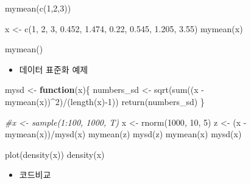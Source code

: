 \documentclass[
]{book}
\newenvironment{Shaded}{\begin{snugshade}}{\end{snugshade}}
\newcommand{\CommentTok}[1]{\textcolor[rgb]{0.56,0.35,0.01}{\textit{#1}}}
\newcommand{\ControlFlowTok}[1]{\textcolor[rgb]{0.13,0.29,0.53}{\textbf{#1}}}
\newcommand{\DecValTok}[1]{\textcolor[rgb]{0.00,0.00,0.81}{#1}}
\newcommand{\FloatTok}[1]{\textcolor[rgb]{0.00,0.00,0.81}{#1}}
\newcommand{\FunctionTok}[1]{\textcolor[rgb]{0.00,0.00,0.00}{#1}}
\newcommand{\NormalTok}[1]{#1}
\newcommand{\OtherTok}[1]{\textcolor[rgb]{0.56,0.35,0.01}{#1}}
\newcommand{\SpecialCharTok}[1]{\textcolor[rgb]{0.00,0.00,0.00}{#1}}
\providecommand{\tightlist}{%
  \setlength{\itemsep}{0pt}\setlength{\parskip}{0pt}}
\begin{document}
\begin{Shaded}
\begin{Highlighting}[]
\FunctionTok{mymean}\NormalTok{(}\FunctionTok{c}\NormalTok{(}\DecValTok{1}\NormalTok{,}\DecValTok{2}\NormalTok{,}\DecValTok{3}\NormalTok{))}

\NormalTok{x }\OtherTok{\textless{}{-}} \FunctionTok{c}\NormalTok{(}\DecValTok{1}\NormalTok{, }\DecValTok{2}\NormalTok{, }\DecValTok{3}\NormalTok{, }\FloatTok{0.452}\NormalTok{, }\FloatTok{1.474}\NormalTok{, }\FloatTok{0.22}\NormalTok{, }\FloatTok{0.545}\NormalTok{, }\FloatTok{1.205}\NormalTok{, }\FloatTok{3.55}\NormalTok{)}
\FunctionTok{mymean}\NormalTok{(x)}

\FunctionTok{mymean}\NormalTok{()}
\end{Highlighting}
\end{Shaded}

\begin{itemize}
\tightlist
\item
  데이터 표준화 예제
\end{itemize}

\begin{Shaded}
\begin{Highlighting}[]
\NormalTok{mysd }\OtherTok{\textless{}{-}} \ControlFlowTok{function}\NormalTok{(x)\{}
\NormalTok{  numbers\_sd }\OtherTok{\textless{}{-}} \FunctionTok{sqrt}\NormalTok{(}\FunctionTok{sum}\NormalTok{((x }\SpecialCharTok{{-}} \FunctionTok{mymean}\NormalTok{(x))}\SpecialCharTok{\^{}}\DecValTok{2}\NormalTok{)}\SpecialCharTok{/}\NormalTok{(}\FunctionTok{length}\NormalTok{(x)}\SpecialCharTok{{-}}\DecValTok{1}\NormalTok{))  }
  \FunctionTok{return}\NormalTok{(numbers\_sd)}
\NormalTok{\}}

\CommentTok{\#x \textless{}{-} sample(1:100, 1000, T)}
\NormalTok{x }\OtherTok{\textless{}{-}} \FunctionTok{rnorm}\NormalTok{(}\DecValTok{1000}\NormalTok{, }\DecValTok{10}\NormalTok{, }\DecValTok{5}\NormalTok{)}
\NormalTok{z }\OtherTok{\textless{}{-}}\NormalTok{ (x }\SpecialCharTok{{-}} \FunctionTok{mymean}\NormalTok{(x))}\SpecialCharTok{/}\FunctionTok{mysd}\NormalTok{(x)}
\FunctionTok{mymean}\NormalTok{(z)}
\FunctionTok{mysd}\NormalTok{(z)}
\FunctionTok{mymean}\NormalTok{(x)}
\FunctionTok{mysd}\NormalTok{(x)}

\FunctionTok{plot}\NormalTok{(}\FunctionTok{density}\NormalTok{(x))}
\FunctionTok{density}\NormalTok{(x)}
\end{Highlighting}
\end{Shaded}

\begin{itemize}
\tightlist
\item
  코드비교
\end{itemize}
\end{document}
